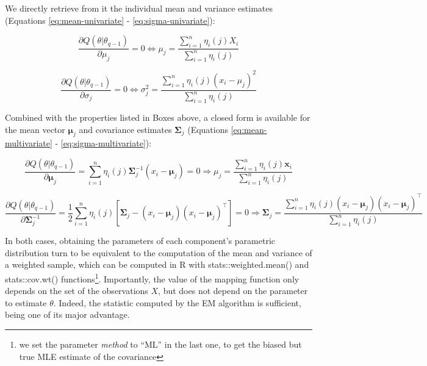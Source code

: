 We directly retrieve from it the individual mean and variance estimates
(Equations \eqref{eq:mean-univariate} - \eqref{eq:sigma-univariate}):

\begin{equation}
 \frac{\partial Q(\theta|\theta_{q-1})}{\partial \mu_j} = 0
 \Leftrightarrow
  \mu_j = \frac{\sum_{i=1}^n \eta_i(j) X_i}{\sum_{i=1}^n \eta_i(j)}
\label{eq:mean-univariate}
\end{equation}

\begin{equation}
 \frac{\partial Q(\theta|\theta_{q-1})}{\partial \sigma_j} = 0
 \Leftrightarrow
\sigma_j^2  =  \frac{\sum_{i=1}^n \eta_i(j) (x_i - \mu_j)^2 }{\sum_{i=1}^n \eta_i(j)}
\label{eq:sigma-univariate}
\end{equation}

Combined with the properties listed in Boxes above, a closed form is
available for the mean vector \(\boldsymbol{\mu}_j\) and covariance estimates
\(\boldsymbol{\Sigma}_j\) (Equations \eqref{eq:mean-multivariate} -
\eqref{eq:sigma-multivariate}):

\begin{equation}
\frac{\partial Q(\theta|\theta_{q-1})}{\partial \boldsymbol{\mu}_j} =
\sum_{i=1}^n \eta_i(j) \boldsymbol{\Sigma}_j^{-1}(x_i - \boldsymbol{\mu}_j) =0
 \Rightarrow
  \mu_j = \frac{\sum_{i=1}^n \eta_i(j) \boldsymbol{x}_i}{\sum_{i=1}^n \eta_i(j)}
\label{eq:mean-multivariate}
\end{equation}

\begin{equation}
 \frac{\partial Q(\theta|\theta_{q-1})}{\partial \boldsymbol{\Sigma}_j^{-1}}=\frac{1}{2} \sum_{i=1}^n \eta_i(j) \left[ \boldsymbol{\Sigma}_j  - (x_i - \boldsymbol{\mu}_j)(x_i - \boldsymbol{\mu}_j)^\top \right]= 0
 \Rightarrow
  \boldsymbol{\Sigma}_j = \frac{\sum_{i=1}^n \eta_i(j) (x_i - \boldsymbol{\mu}_j)(x_i - \boldsymbol{\mu}_j)^\top }{\sum_{i=1}^n \eta_i(j)}
\label{eq:sigma-multivariate}
\end{equation}

In both cases, obtaining the parameters of each component's parametric distribution
turn to be equivalent to the computation of the mean and variance of a
weighted sample, which can be computed in R with
stats::weighted.mean() and
stats::cov.wt() functions\footnote{we set the parameter \emph{method} to
  ``ML'' in the last one, to get the biased but true MLE estimate of the covariance}. Importantly, the value of the mapping function only depends on the set of the observations \(X\), but does not depend on the parameter to estimate \(\theta\). Indeed, the statistic computed by the EM algorithm is sufficient, being one of its major advantage.

